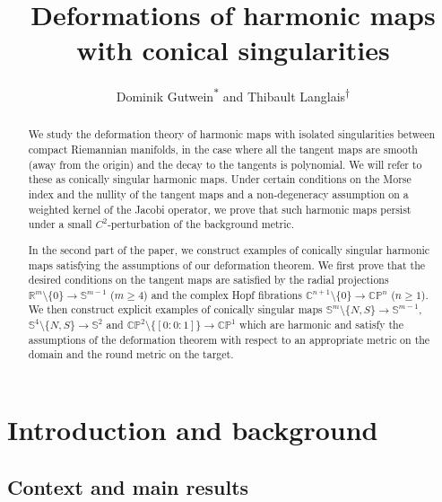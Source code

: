 \documentclass{article}
\title{Deformations of harmonic maps with conical singularities}
\author{Dominik Gutwein\textsuperscript{$*$} and Thibault Langlais\textsuperscript{$\dagger$}}
\date{}
\numberwithin{equation}{section}        %
\theoremstyle{bfnote}
\theoremstyle{definition}
\theoremstyle{bfremark}
\newcommand{\R}{\mathbb{R}}                 %
\newcommand{\C}{\mathbb{C}}                 %
\newcommand{\Sp}{\mathbb{S}}                %
\begin{document}
\maketitle



\begin{abstract}
    We study the deformation theory of harmonic maps with isolated singularities between compact Riemannian manifolds, in the case where all the tangent maps are smooth (away from the origin) and the decay to the tangents is polynomial. We will refer to these as conically singular harmonic maps. Under certain conditions on the Morse index and the nullity of the tangent maps and a non-degeneracy assumption on a weighted kernel of the Jacobi operator, we prove that such harmonic maps persist under a small $C^2$-perturbation of the background metric.

    In the second part of the paper, we construct examples of conically singular harmonic maps satisfying the assumptions of our deformation theorem. We first prove that the desired conditions on the tangent maps are satisfied by the radial projections $\R^m \setminus \{0\} \to \Sp^{m-1}$ ($m \geq 4$) and the complex Hopf fibrations $\C^{n+1} \setminus \{0\} \to \mathbb{CP}^{n}$ ($n \geq 1$). We then construct explicit examples of conically singular maps $\Sp^{m} \setminus \{N,S\} \to \Sp^{m-1}$, $\Sp^{4} \setminus \{N,S\} \to \Sp^2$ and $\mathbb{CP}^2 \setminus \{[0:0:1]\} \to \mathbb{CP}^1$ which are harmonic and satisfy the assumptions of the deformation theorem with respect to an appropriate metric on the domain and the round metric on the target.
\end{abstract}

\vspace{1cm}
\tableofcontents

\setcounter{footnote}{0}
\renewcommand{\thefootnote}{\arabic{footnote}}

\newpage


    \section{Introduction and background}

    \subsection{Context and main results}
\end{document}
